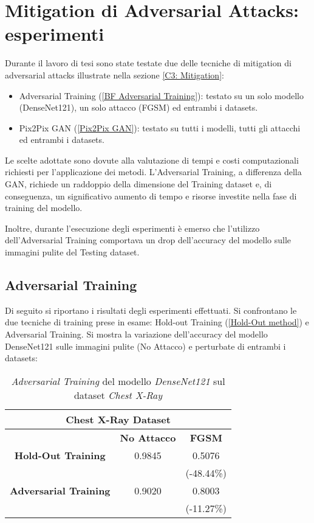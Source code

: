 \chapter{Mitigation di Adversarial Attacks: esperimenti}
\label{chap:5}
Durante il lavoro di tesi sono state testate due delle tecniche di mitigation di adversarial attacks illustrate nella sezione \ref{C3: Mitigation}:
    \begin{itemize}
        \item Adversarial Training (\ref{BF Adversarial Training}): testato su un solo modello (DenseNet121), un solo attacco (FGSM) ed entrambi i datasets. 
        \item Pix2Pix GAN (\ref{Pix2Pix GAN}): testato su tutti i modelli, tutti gli attacchi ed entrambi i datasets.
    \end{itemize}
    
    Le scelte adottate sono dovute alla valutazione di tempi e costi computazionali richiesti per l'applicazione dei metodi. L'Adversarial Training, a differenza della GAN, richiede un raddoppio della dimensione del Training dataset e, di conseguenza, un significativo aumento di tempo e risorse investite nella fase di training del modello.
    
    Inoltre, durante l'esecuzione degli esperimenti è emerso che l'utilizzo dell'Adversarial Training comportava un drop dell'accuracy del modello sulle immagini pulite del Testing dataset.

\newpage
\section{Adversarial Training}
    Di seguito si riportano i risultati degli esperimenti effettuati.
    Si confrontano le due tecniche di training prese in esame: Hold-out Training (\ref{Hold-Out method}) e Adversarial Training. 
    Si mostra la variazione dell'accuracy del modello DenseNet121 sulle immagini pulite (No Attacco) e perturbate di entrambi i datasets:
    \begin{table}[!h]
        \centering
        \begin{tabular}{|c||c|c|}
            \hline
            \multicolumn{3}{|c|}{\textbf{Chest X-Ray Dataset}} \rule[-3mm]{0mm}{8mm}\\
            \hline
            \rule[-3mm]{0mm}{8mm}
            & \textbf{No Attacco} & \textbf{FGSM}\\
            \hline \hline
            \rule[-3mm]{0mm}{8mm}
            \textbf{Hold-Out Training}      & 0.9845 & 0.5076 \\
             & & (-48.44\%) \\
            \hline
            \rule[-3mm]{0mm}{8mm}
            \textbf{Adversarial Training}   & 0.9020 & 0.8003 \\
             & &  (-11.27\%)\\
            \hline
        \end{tabular}
        \caption{\textit{Adversarial Training} del modello \textit{DenseNet121} sul dataset \textit{Chest X-Ray}}
        \label{Adversarial Training Chest X-Ray}
    \end{table}
    
